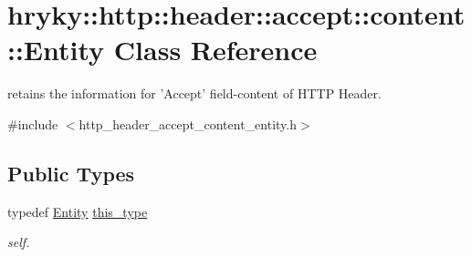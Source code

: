 \hypertarget{classhryky_1_1http_1_1header_1_1accept_1_1content_1_1_entity}{\section{hryky\-:\-:http\-:\-:header\-:\-:accept\-:\-:content\-:\-:Entity Class Reference}
\label{classhryky_1_1http_1_1header_1_1accept_1_1content_1_1_entity}
}


retains the information for 'Accept' field-\/content of H\-T\-T\-P Header.  




{\ttfamily \#include $<$http\-\_\-header\-\_\-accept\-\_\-content\-\_\-entity.\-h$>$}

\subsection*{Public Types}
\begin{DoxyCompactItemize}
\item 
\hypertarget{classhryky_1_1http_1_1header_1_1accept_1_1content_1_1_entity_a33b04443de128c36675e5778593d0380}{typedef \hyperlink{classhryky_1_1http_1_1header_1_1accept_1_1content_1_1_entity}{Entity} \hyperlink{classhryky_1_1http_1_1header_1_1accept_1_1content_1_1_entity_a33b04443de128c36675e5778593d0380}{this\-\_\-type}}\label{classhryky_1_1http_1_1header_1_1accept_1_1content_1_1_entity_a33b04443de128c36675e5778593d0380}

\begin{DoxyCompactList}\small\item\em self. \end{DoxyCompactList}\end{DoxyCompactItemize}
